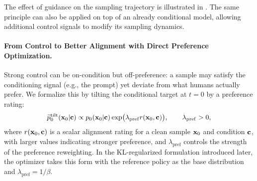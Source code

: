 The effect of guidance on the sampling trajectory is illustrated in
. The same principle can also be applied on top of an
already conditional model, allowing additional control signals to modify its
sampling dynamics.

\paragraph{From Control to Better Alignment with Direct Preference Optimization.}

Strong control can be on-condition but off-preference: a sample may satisfy the
conditioning signal (e.g., the prompt) yet deviate from what humans actually
prefer. We formalize this by tilting the conditional target at $t=0$ by a
preference rating:
\[
\widetilde p_0^{\mathrm{tilt}}({\mathbf{x}}_0|{\mathbf{c}})
\propto
p_0({\mathbf{x}}_0|{\mathbf{c}})
\exp\bigl(
\lambda_{\mathrm{pref}} r({\mathbf{x}}_0,{\mathbf{c}})
\bigr),
\qquad
\lambda_{\mathrm{pref}}>0,
\]
where $r({\mathbf{x}}_0,{\mathbf{c}})$ is a scalar alignment rating for a clean sample
${\mathbf{x}}_0$ and condition ${\mathbf{c}}$, with larger values indicating stronger
preference, and $\lambda_{\mathrm{pref}}$ controls the strength of the
preference reweighting. In the KL-regularized formulation introduced later,
the optimizer takes this form with the reference policy as the base
distribution and $\lambda_{\mathrm{pref}}=1/\beta$.


